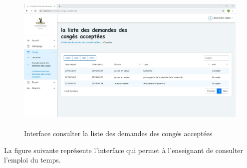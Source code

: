 \documentclass[12 pt ]{report}
\begin{document}
\begin{figure}[h]
 \begin{center}
\includegraphics[width= 18 cm ,height=  7cm]{consulter_conge_accepter.PNG}
\caption{Interface consulter la liste des demandes des congés acceptées}

\end{center}
\end{figure}
\newpage

La figure suivante représente l'interface qui permet à l'enseignant de consulter l'emploi du temps.
\end{document}
